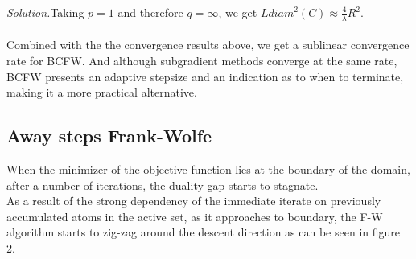 \textit{Solution.}\quad Taking $p=1$ and therefore $q=\infty$, we get
$L\textit{diam}^{2}(C)\approx \frac{4}{\lambda}R^{2}$.\\ \\
Combined with the the convergence results above, we get a sublinear convergence
rate for BCFW. And although subgradient methods converge at the same rate, BCFW
presents an adaptive stepsize and an indication as to when to terminate, making
it a more practical alternative.



\subsection{Away steps Frank-Wolfe}
When the minimizer of the objective function lies at the boundary of the domain,
after a number of iterations, the duality gap starts to stagnate.\\ As a result
of the strong dependency of the immediate iterate on previously accumulated
atoms in the active set, as it approaches to boundary, the F-W algorithm starts
to zig-zag around the descent direction as can be seen in figure 2.\\
\begin{algorithmic}
    \\
     \ENDFOR
\end{algorithmic}

